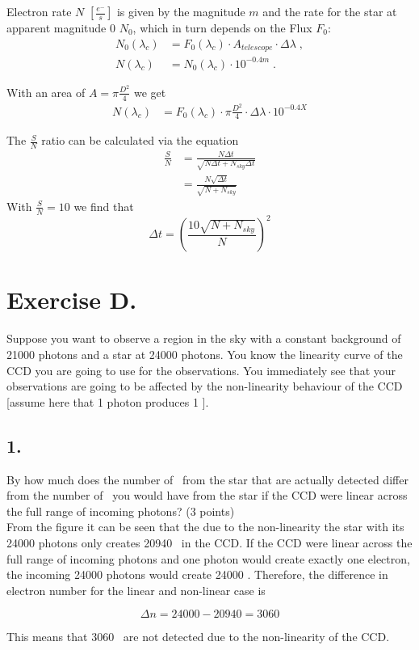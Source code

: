 \documentclass[11pt,a4paper,twoside]{article}
\newcommand{\electron}{\ce{e^-}}
\newcommand{\SNR}{\ensuremath{\frac{S}{N}} }
\begin{document}
Electron rate $N$ $[\frac{e^-}{s}]$ is given by the magnitude $m$ and the rate 
for the star at apparent magnitude 0 $N_0$, which in turn depends on the 
Flux $F_0$:
\begin{align}
    N_0(\lambda_c) &= F_0(\lambda_c) \cdot A_{telescope} \cdot \Delta\lambda \;,\\
    N(\lambda_c) &= N_0(\lambda_c) \cdot 10^{-0.4m} \;.
\end{align}

With an area of $A = \pi\frac{D^2}{4}$ we get 
\begin{align}
    N(\lambda_c)&= F_0(\lambda_c) \cdot \pi\frac{D^2}{4} 
                   \cdot \Delta\lambda \cdot10^{-0.4X}
\end{align}

The \SNR ratio can be calculated via the equation
\begin{align}
    \SNR &= \frac{N\Delta t}{\sqrt{N\Delta t + N_{sky}\Delta t}} \\
    &= \frac{N\sqrt{\Delta t}}{\sqrt{N + N_{sky}}}
\end{align}
With $\frac{S}{N}=10$ we find that 
$$ \Delta t = \left(\frac{10\sqrt{N + N_{sky}}}{N}\right)^2 $$

\section*{Exercise D.}

Suppose you want to observe a region in the sky with a constant background of \num{21000} photons and a star at \num{24000} photons. You know the linearity curve of the CCD you are going to use for the observations. You immediately see that your observations are going to be affected by the non-linearity behaviour of the CCD [assume here that \num{1} photon produces \num{1} \electron].

\subsection*{1.} By how much does the number of \electron \ from the star that are actually detected differ from the number of \electron \ you would have from the star if the CCD were linear across the full range of incoming photons? (3 points) \\

From the figure it can be seen that the due to the non-linearity the star with its \num{24000} photons only creates \num{20940} \electron \ in the CCD. If the CCD were linear across the full range of incoming photons and one photon would create exactly one electron, the incoming \num{24000} photons would create \num{24000} \electron. Therefore, the difference in electron number for the linear and non-linear case is 

\begin{equation}
 \Delta n = \num{24000} - \num{20940} = \num{3060}
\end{equation}

This means that \num{3060} \electron \ are not detected due to the non-linearity of the CCD. 
\end{document}
